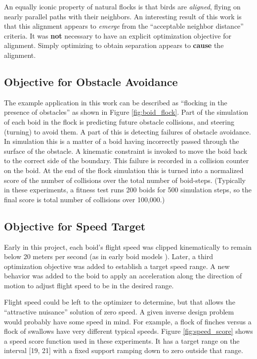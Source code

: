 \documentclass[letterpaper]{article}
\begin{document}
An equally iconic property of natural flocks is that birds are \textit{aligned}, flying on nearly parallel paths with their neighbors. An interesting result of this work is that this alignment appears to \textit{emerge} from the ``acceptable neighbor distance'' criteria. It was \textbf{not} necessary to have an explicit optimization objective for alignment. Simply optimizing to obtain separation appears to \textbf{cause} the alignment.

\subsection{Objective for Obstacle Avoidance}
\label{subsec:avoidance_objective}

The example application in this work can be described as ``flocking in the presence of obstacles'' as shown in Figure \ref{fig:boid_flock}. Part of the simulation of each boid in the flock is predicting future obstacle collisions, and steering (turning) to avoid them. A part of this is detecting failures of obstacle avoidance. In simulation this is a matter of a boid having incorrectly passed through the surface of the obstacle. A kinematic constraint is invoked to move the boid back to the correct side of the boundary. This failure is recorded in a collision counter on the boid. At the end of the flock simulation this is turned into a normalized score of the number of collisions over the total number of boid-steps. (Typically in these experiments, a fitness test runs 200 boids for 500 simulation steps, so the final score is total number of collisions over 100,000.)

\subsection{Objective for Speed Target}
\label{subsec:speed_objective}

Early in this project, each boid's flight speed was clipped kinematically to remain below 20 meters per second (as in early boid models \citep{reynolds_flocks_1987}). Later, a third optimization objective was added to establish a target speed range. A new behavior was added to the boid to apply an acceleration along the direction of motion to adjust flight speed to be in the desired range.

Flight speed could be left to the optimizer to determine, but that allows the ``attractive nuisance'' solution of zero speed. A given inverse design problem would probably have some speed in mind. For example, a flock of finches versus a flock of swallows have very different typical speeds. Figure \ref{fig:speed_score} shows a speed score function used in these experiments. It has a target range on the interval [19, 21] with a fixed support ramping down to zero outside that range.
\end{document}
